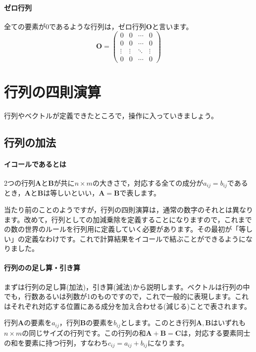 \documentclass{ltjsbook}
\begin{document}
\paragraph{ゼロ行列}
全ての要素が$0$であるような行列は，ゼロ行列$\bm{O}$と言います。
\[ \bm{O} = \begin{pmatrix}
		0      & 0      & \cdots & 0      \\
		0      & 0      & \cdots & 0      \\
		\vdots & \vdots & \ddots & \vdots \\
		0      & 0      & \cdots & 0
	\end{pmatrix}
\]

\section{行列の四則演算}
行列やベクトルが定義できたところで，操作に入っていきましょう。


\subsection{行列の加法}
\paragraph{イコールであるとは}
2つの行列$\bm{A}$と$\bm{B}$が共に$n \times m$の大きさで，対応する全ての成分が$a_{ij}=b_{ij}$であるとき，$\bm{A}$と$\bm{B}$は等しいといい，$\bm{A}=\bm{B}$で表します。

当たり前のことのようですが，行列の四則演算は，通常の数字のそれとは異なります。改めて，行列としての加減乗除を定義することになりますので，これまでの数の世界のルールを行列用に定義していく必要があります。その最初が「等しい」の定義なわけです。これで計算結果をイコールで結ぶことができるようになりました。

\paragraph{行列のの足し算・引き算}
まずは行列の足し算(加法)，引き算(減法)から説明します。ベクトルは行列の中でも，行数あるいは列数が1のものですので，これで一般的に表現します。これはそれぞれ対応する位置にある成分を加え合わせる(減じる)ことで表されます。

行列$\bm{A}$の要素を$a_{ij}$，行列$\bm{B}$の要素を$b_{ij}$とします。このとき行列$\bm{A},\bm{B}$はいずれも$n \times m$の同じサイズの行列です。この行列の和$\bm{A}+\bm{B}=\bm{C}$は，対応する要素同士の和を要素に持つ行列，すなわち$c_{ij} = a_{ij}+b_{ij}$になります。
\end{document}
